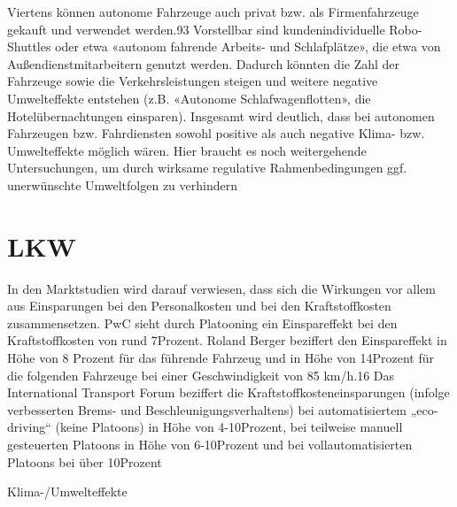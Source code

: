 Viertens können autonome Fahrzeuge auch privat bzw. als Firmenfahrzeuge gekauft und verwendet werden.93 Vorstellbar sind kundenindividuelle
Robo-Shuttles oder etwa «autonom fahrende Arbeits- und Schlafplätze», die
etwa von Außendienstmitarbeitern genutzt werden. Dadurch könnten die
Zahl der Fahrzeuge sowie die Verkehrsleistungen steigen und weitere negative
Umwelteffekte entstehen (z.B. «Autonome Schlafwagenflotten», die Hotelübernachtungen einsparen).
Insgesamt wird deutlich, dass bei autonomen Fahrzeugen bzw. Fahrdiensten
sowohl positive als auch negative Klima- bzw. Umwelteffekte möglich wären. Hier
braucht es noch weitergehende Untersuchungen, um durch wirksame regulative
Rahmenbedingungen ggf. unerwünschte Umweltfolgen zu verhindern



































\section{LKW}
In den Marktstudien wird darauf verwiesen, dass sich die Wirkungen vor
allem aus Einsparungen bei den Personalkosten und bei den Kraftstoffkosten
zusammensetzen. PwC sieht durch Platooning ein Einspareffekt bei den
Kraftstoffkosten von rund 7Prozent. Roland Berger beziffert den Einspareffekt in
Höhe von 8 Prozent für das führende Fahrzeug und in Höhe von 14Prozent für die
folgenden Fahrzeuge bei einer Geschwindigkeit von 85 km/h.16 Das
International Transport Forum beziffert die Kraftstoffkosteneinsparungen
(infolge verbesserten Brems- und Beschleunigungsverhaltens) bei
automatisiertem „eco-driving“ (keine Platoons) in Höhe von 4-10Prozent, bei
teilweise manuell gesteuerten Platoons in Höhe von 6-10Prozent und bei
vollautomatisierten Platoons bei über 10Prozent



Klima-/Umwelteffekte



